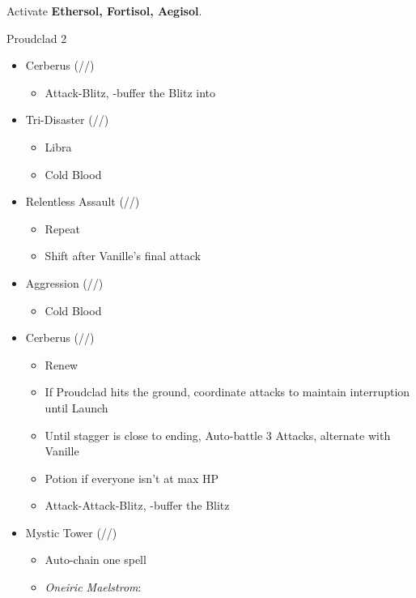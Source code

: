 \begin{paracol}{2}
\switchcolumn*
Activate \textbf{Ethersol, Fortisol, Aegisol}.
\renewcommand{\first}{[1] Aggression (\rav/\com/\com)}
\renewcommand{\second}{[2] Cerberus (\com/\com/\com)}
\renewcommand{\third}{[3] Mystic Tower (\rav/\sen/\rav)}
\renewcommand{\fourth}{[4] Solidarity (\com/\sen/\med)}
\renewcommand{\fifth}{[5] Relentless Assault (\rav/\com/\rav)}
\renewcommand{\sixth}{[6] Tri-Disaster (\rav/\rav/\rav)}
\begin{battle}{Proudclad 2}
	\begin{itemize}
		\item \second
		      \begin{itemize}
			      \item Attack-Blitz, \rav-buffer the Blitz into
		      \end{itemize}
		\item \sixth
		      \begin{itemize}
			      \item Libra
			      \item Cold Blood
		      \end{itemize}
		\item \fifth
		      \begin{itemize}
			      \item Repeat
			      \item Shift after Vanille's final attack
		      \end{itemize}
		\item \first
		      \begin{itemize}
			      \item Cold Blood
		      \end{itemize}
		\item \second
		      \begin{itemize}
			      \item Renew
			      \item If Proudclad hits the ground, coordinate attacks to maintain interruption until Launch
			      \item Until stagger is close to ending, Auto-battle 3 Attacks, alternate with Vanille
			      \item Potion if everyone isn't at max HP
			      \item Attack-Attack-Blitz, \rav-buffer the Blitz
		      \end{itemize}
		\item \third
		      \begin{itemize}
			      \item Auto-chain one spell
			      \item \textit{Oneiric Maelstrom}:

\end{itemize}
\end{itemize}
\end{battle}
\end{paracol}

